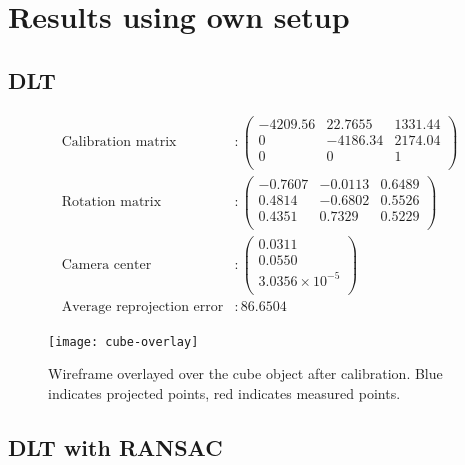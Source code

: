 \documentclass[a4paper,11pt]{article}
\begin{document}
  \section{Results using own setup}
    \subsection*{DLT}
    \begin{align*}
     \text{Calibration matrix}
     &: 
     \begin{pmatrix}
       -4209.56 & 22.7655 & 1331.44\\
       0 & -4186.34 & 2174.04\\
       0 & 0 & 1\\
     \end{pmatrix}\\
     \text{Rotation matrix}
     &:
     \begin{pmatrix}
      -0.7607 & -0.0113 & 0.6489 \\
      0.4814 & -0.6802 & 0.5526 \\
      0.4351 & 0.7329 & 0.5229 \\
     \end{pmatrix}\\
      \text{Camera center}
      &:
      \begin{pmatrix}
      0.0311\\
      0.0550\\
      3.0356\times10^{-5}\\
      \end{pmatrix}\\
     \text{Average reprojection error}
     &: 86.6504
    \end{align*}
     
     \begin{figure}[H]
      \centering
      \texttt{[image: cube-overlay]}
      \caption{Wireframe overlayed over the cube object after calibration. Blue indicates projected points, red indicates measured points.}
     \end{figure}
    
    \subsection*{DLT with RANSAC}
    
\end{document}
